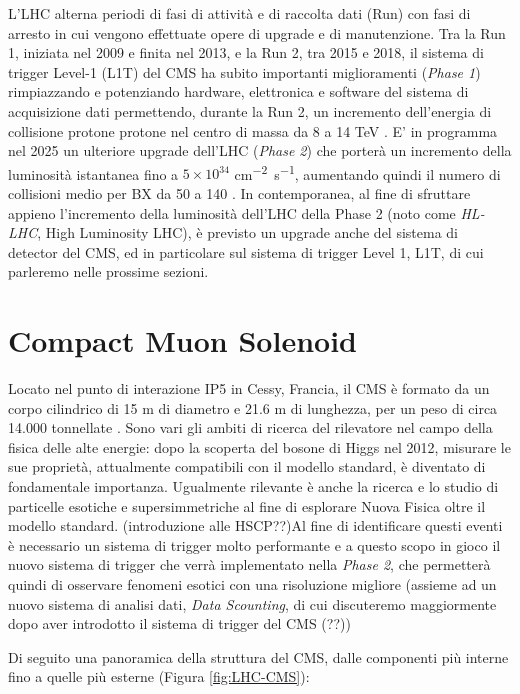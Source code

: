L'LHC alterna periodi di fasi di attività e di raccolta dati (Run) con fasi di arresto in cui vengono effettuate opere di upgrade e di manutenzione. Tra la Run 1, iniziata nel 2009 e finita nel 2013, e la Run 2, tra 2015 e 2018, il sistema di trigger Level-1 (L1T) del CMS ha subito importanti miglioramenti (\textit{Phase 1}) rimpiazzando e potenziando hardware, elettronica e software del sistema di acquisizione dati permettendo, durante la Run 2, un incremento dell'energia di collisione protone protone nel centro di massa da 8 a 14 TeV \cite{sirunyan2020performance}. E' in programma nel 2025 un ulteriore upgrade dell'LHC (\textit{Phase 2}) che porterà un incremento della luminosità istantanea fino a $5\times 10^{34}$ \si{cm^{-2} s^{-1}}, aumentando quindi il numero di collisioni medio per BX da 50 a 140 \cite{collaboration2021phase}. In contemporanea, al fine di sfruttare appieno l'incremento della luminosità dell'LHC della Phase 2 (noto come \textit{HL-LHC}, High Luminosity LHC), è previsto un upgrade anche del sistema di detector del CMS, ed in particolare sul sistema di trigger Level 1, L1T, di cui parleremo nelle prossime sezioni.

\section{Compact Muon Solenoid}  
\label{sec:CMSDescrizione}

Locato nel punto di interazione IP5 in Cessy, Francia, il CMS è formato da un corpo cilindrico di 15 m di diametro e 21.6 m di lunghezza, per un peso di circa 14.000 tonnellate \cite{cms2008cms}. Sono vari gli ambiti di ricerca del rilevatore nel campo della fisica delle alte energie: dopo la scoperta del bosone di Higgs nel 2012, misurare le sue proprietà, attualmente compatibili con il modello standard, è diventato di fondamentale importanza. Ugualmente rilevante è anche la ricerca e lo studio di particelle esotiche e supersimmetriche al fine di esplorare Nuova Fisica oltre il modello standard. (introduzione alle HSCP??)Al fine di identificare questi eventi è necessario un sistema di trigger molto performante \cite{sirunyan2020performance} e a questo scopo in gioco il nuovo sistema di trigger che verrà implementato nella \textit{Phase 2}, che permetterà quindi di osservare fenomeni esotici con una risoluzione migliore (assieme ad un nuovo sistema di analisi dati, \textit{Data Scounting}, di cui discuteremo maggiormente dopo aver introdotto il sistema di trigger del CMS (??))

Di seguito una panoramica della struttura del CMS, dalle componenti più interne fino a quelle più esterne \cite{MasterThesisNicLai}(Figura \ref{fig:LHC-CMS}):


